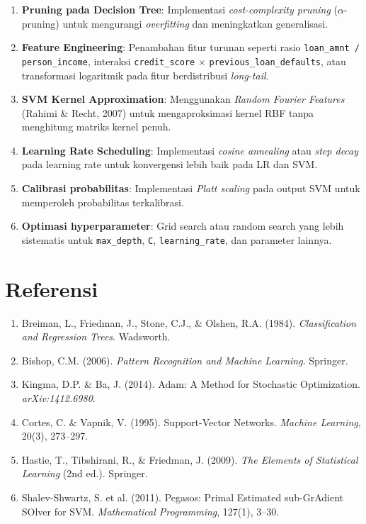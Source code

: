 \documentclass[12pt,a4paper]{article}
\begin{document}
\begin{enumerate}
    \item \textbf{Pruning pada Decision Tree}: Implementasi \textit{cost-complexity pruning} ($\alpha$-pruning) untuk mengurangi \textit{overfitting} dan meningkatkan generalisasi.

    \item \textbf{Feature Engineering}: Penambahan fitur turunan seperti rasio \texttt{loan\_amnt / person\_income}, interaksi \texttt{credit\_score} $\times$ \texttt{previous\_loan\_defaults}, atau transformasi logaritmik pada fitur berdistribusi \textit{long-tail}.

    \item \textbf{SVM Kernel Approximation}: Menggunakan \textit{Random Fourier Features} (Rahimi \& Recht, 2007) untuk mengaproksimasi kernel RBF tanpa menghitung matriks kernel penuh.

    \item \textbf{Learning Rate Scheduling}: Implementasi \textit{cosine annealing} atau \textit{step decay} pada learning rate untuk konvergensi lebih baik pada LR dan SVM.

    \item \textbf{Calibrasi probabilitas}: Implementasi \textit{Platt scaling} pada output SVM untuk memperoleh probabilitas terkalibrasi.

    \item \textbf{Optimasi hyperparameter}: Grid search atau random search yang lebih sistematis untuk \texttt{max\_depth}, \texttt{C}, \texttt{learning\_rate}, dan parameter lainnya.
\end{enumerate}

\section{Referensi}
\label{sec:referensi-kaggle}

\begin{enumerate}
    \item Breiman, L., Friedman, J., Stone, C.J., \& Olshen, R.A. (1984). \textit{Classification and Regression Trees}. Wadsworth.
    \item Bishop, C.M. (2006). \textit{Pattern Recognition and Machine Learning}. Springer.
    \item Kingma, D.P. \& Ba, J. (2014). Adam: A Method for Stochastic Optimization. \textit{arXiv:1412.6980}.
    \item Cortes, C. \& Vapnik, V. (1995). Support-Vector Networks. \textit{Machine Learning}, 20(3), 273--297.
    \item Hastie, T., Tibshirani, R., \& Friedman, J. (2009). \textit{The Elements of Statistical Learning} (2nd ed.). Springer.
    \item Shalev-Shwartz, S. et al. (2011). Pegasos: Primal Estimated sub-GrAdient SOlver for SVM. \textit{Mathematical Programming}, 127(1), 3--30.
\end{enumerate}

\end{document}
